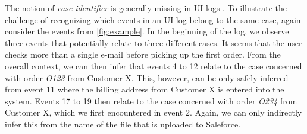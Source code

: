 The notion of \textit{case identifier} is generally missing in UI logs \cite{leno2021robotic}. To illustrate the challenge of recognizing which events in an UI log belong to the same case, again consider the events from \autoref{fig:example}. In the beginning of the log, we observe three events that potentially relate to three different cases. It seems that the user checks more than a single e-mail before picking up the first order. From the overall context, we can then infer that events 4 to 12 relate to the case concerned with order \textit{O123} from Customer X. This, however, can be only safely inferred from event 11 where the billing address from Customer X is entered into the system. Events 17 to 19 then relate to the case concerned with order \textit{O234} from Customer X, which we first encountered in event 2. Again, we can only indirectly infer this from the name of the file that is uploaded to Saleforce. 


%
% 

